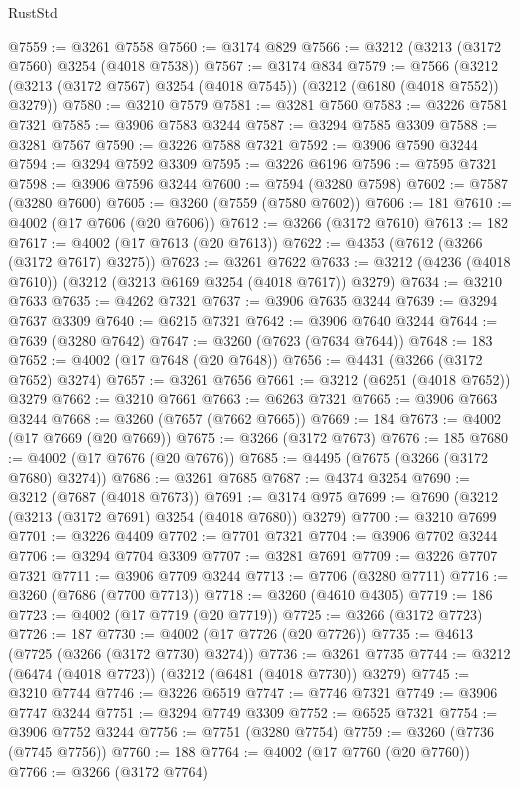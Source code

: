 \begin{lexlean}{RustStd}
\begin{coremodule}
{\begin{coremodule}
{{{{{{{{{{{{{{{{{{{{{{{{{{@7559 := @3261 @7558
@7560 := @3174 @829
@7566 := @3212 (@3213 (@3172 @7560) @3254 (@4018 @7538))
@7567 := @3174 @834
@7579 := @7566 (@3212 (@3213 (@3172 @7567) @3254 (@4018 @7545)) (@3212 (@6180 (@4018 @7552)) @3279))
@7580 := @3210 @7579
@7581 := @3281 @7560
@7583 := @3226 @7581 @7321
@7585 := @3906 @7583 @3244
@7587 := @3294 @7585 @3309
@7588 := @3281 @7567
@7590 := @3226 @7588 @7321
@7592 := @3906 @7590 @3244
@7594 := @3294 @7592 @3309
@7595 := @3226 @6196
@7596 := @7595 @7321
@7598 := @3906 @7596 @3244
@7600 := @7594 (@3280 @7598)
@7602 := @7587 (@3280 @7600)
@7605 := @3260 (@7559 (@7580 @7602))
@7606 := 181
@7610 := @4002 (@17 @7606 (@20 @7606))
@7612 := @3266 (@3172 @7610)
@7613 := 182
@7617 := @4002 (@17 @7613 (@20 @7613))
@7622 := @4353 (@7612 (@3266 (@3172 @7617) @3275))
@7623 := @3261 @7622
@7633 := @3212 (@4236 (@4018 @7610)) (@3212 (@3213 @6169 @3254 (@4018 @7617)) @3279)
@7634 := @3210 @7633
@7635 := @4262 @7321
@7637 := @3906 @7635 @3244
@7639 := @3294 @7637 @3309
@7640 := @6215 @7321
@7642 := @3906 @7640 @3244
@7644 := @7639 (@3280 @7642)
@7647 := @3260 (@7623 (@7634 @7644))
@7648 := 183
@7652 := @4002 (@17 @7648 (@20 @7648))
@7656 := @4431 (@3266 (@3172 @7652) @3274)
@7657 := @3261 @7656
@7661 := @3212 (@6251 (@4018 @7652)) @3279
@7662 := @3210 @7661
@7663 := @6263 @7321
@7665 := @3906 @7663 @3244
@7668 := @3260 (@7657 (@7662 @7665))
@7669 := 184
@7673 := @4002 (@17 @7669 (@20 @7669))
@7675 := @3266 (@3172 @7673)
@7676 := 185
@7680 := @4002 (@17 @7676 (@20 @7676))
@7685 := @4495 (@7675 (@3266 (@3172 @7680) @3274))
@7686 := @3261 @7685
@7687 := @4374 @3254
@7690 := @3212 (@7687 (@4018 @7673))
@7691 := @3174 @975
@7699 := @7690 (@3212 (@3213 (@3172 @7691) @3254 (@4018 @7680)) @3279)
@7700 := @3210 @7699
@7701 := @3226 @4409
@7702 := @7701 @7321
@7704 := @3906 @7702 @3244
@7706 := @3294 @7704 @3309
@7707 := @3281 @7691
@7709 := @3226 @7707 @7321
@7711 := @3906 @7709 @3244
@7713 := @7706 (@3280 @7711)
@7716 := @3260 (@7686 (@7700 @7713))
@7718 := @3260 (@4610 @4305)
@7719 := 186
@7723 := @4002 (@17 @7719 (@20 @7719))
@7725 := @3266 (@3172 @7723)
@7726 := 187
@7730 := @4002 (@17 @7726 (@20 @7726))
@7735 := @4613 (@7725 (@3266 (@3172 @7730) @3274))
@7736 := @3261 @7735
@7744 := @3212 (@6474 (@4018 @7723)) (@3212 (@6481 (@4018 @7730)) @3279)
@7745 := @3210 @7744
@7746 := @3226 @6519
@7747 := @7746 @7321
@7749 := @3906 @7747 @3244
@7751 := @3294 @7749 @3309
@7752 := @6525 @7321
@7754 := @3906 @7752 @3244
@7756 := @7751 (@3280 @7754)
@7759 := @3260 (@7736 (@7745 @7756))
@7760 := 188
@7764 := @4002 (@17 @7760 (@20 @7760))
@7766 := @3266 (@3172 @7764)
}}}}}}}}}}}}}}}}}}}}}}}}}}
\end{coremodule}}
\end{coremodule}
\end{lexlean}
